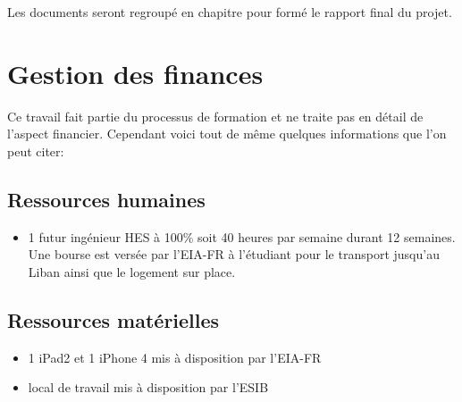 Les documents seront regroupé en chapitre pour formé le rapport final du projet.

\section{Gestion des finances}
Ce travail fait partie du processus de formation et ne traite pas en détail de l'aspect financier. Cependant voici tout de même quelques informations que l'on peut citer:
\subsection{Ressources humaines}
\begin{itemize}
	\item 1 futur ingénieur HES  à 100\%  soit 40 heures par semaine durant 12 semaines. Une bourse est versée par  l'\gls{EIA-FR} à l'étudiant pour le transport jusqu'au Liban ainsi que le logement sur place. 
\end{itemize}
\subsection{Ressources matérielles}
\begin{itemize}
	\item 1 iPad2 et 1 iPhone 4  mis à disposition par l'\gls{EIA-FR}
	\item local de travail mis à disposition par l'\gls{ESIB}
\end{itemize}